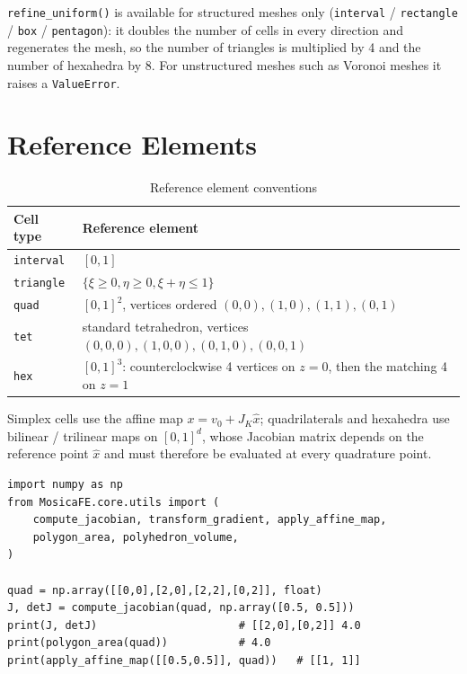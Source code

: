\documentclass[11pt,oneside]{book}
\theoremstyle{definition}
\theoremstyle{plain}
\newcommand{\code}[1]{\texttt{#1}}
\begin{document}
\code{refine\_\allowbreak uniform()} is available for structured meshes only (\code{interval} /
\code{rectangle} / \code{box} / \code{pentagon}): it doubles the number of cells in
every direction and regenerates the mesh, so the number of triangles is multiplied
by 4 and the number of hexahedra by 8. For unstructured meshes such as Voronoi
meshes it raises a \code{ValueError}.

\section{Reference Elements}

\begin{table}[htbp]
\centering
\caption{Reference element conventions}
\label{tab:refelem}
\begin{lrbox}{\guideTableBox}
\begin{tabular}{@{}ll@{}}
\toprule
Cell type & Reference element \\
\midrule
\code{interval} & $[0,1]$ \\
\code{triangle} & $\{\xi\ge0,\eta\ge0,\xi+\eta\le1\}$ \\
\code{quad} & $[0,1]^2$, vertices ordered $(0,0),(1,0),(1,1),(0,1)$ \\
\code{tet} & standard tetrahedron, vertices $(0,0,0),(1,0,0),(0,1,0),(0,0,1)$ \\
\code{hex} & $[0,1]^3$: counterclockwise 4 vertices on $z=0$, then the matching 4 on $z=1$ \\
\bottomrule
\end{tabular}
\end{lrbox}%
\ifdim\wd\guideTableBox>\linewidth
  \resizebox{\linewidth}{!}{\usebox{\guideTableBox}}%
\else\usebox{\guideTableBox}\fi
\end{table}

Simplex cells use the affine map $x=v_0+J_K\hat x$; quadrilaterals and hexahedra use
bilinear / trilinear maps on $[0,1]^d$, whose Jacobian matrix depends on the
reference point $\hat x$ and must therefore be evaluated at every quadrature point.

\begin{lstlisting}[language=MosicaFE,caption={Geometric tools}]
import numpy as np
from MosicaFE.core.utils import (
    compute_jacobian, transform_gradient, apply_affine_map,
    polygon_area, polyhedron_volume,
)

quad = np.array([[0,0],[2,0],[2,2],[0,2]], float)
J, detJ = compute_jacobian(quad, np.array([0.5, 0.5]))
print(J, detJ)                      # [[2,0],[0,2]] 4.0
print(polygon_area(quad))           # 4.0
print(apply_affine_map([[0.5,0.5]], quad))   # [[1, 1]]
\end{lstlisting}
\end{document}
